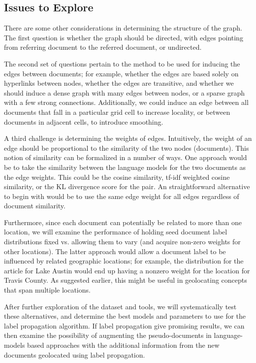 \subsection{Issues to Explore}
There are some other considerations in determining the structure of the graph.
The first question is whether the graph should be directed, with edges pointing from referring document to the referred document, or undirected. 

The second set of questions pertain to the method to be used for inducing the edges between documents;
for example, whether the edges are based solely on hyperlinks between nodes, whether the edges are transitive, and whether we should induce a dense graph with many edges between nodes, or a sparse graph with a few strong connections.
Additionally, we could induce an edge between all documents that fall in a particular grid cell to increase locality, or between documents in adjacent cells, to introduce smoothing.

A third challenge is determining the weights of edges.
Intuitively, the weight of an edge should be proportional to the similarity of the two nodes (documents).
This notion of similarity can be formalized in a number of ways.
One approach would be to take the similarity between the language models for the two documents as the edge weights.
This could be the cosine similarity, tf-idf weighted cosine similarity, or the KL divergence score for the pair.
An straightforward alternative to begin with would be to use the same edge weight for all edges regardless of document similarity.
 
Furthermore, since each document can potentially be related to more than one location, we will examine the performance of holding seed document label distributions fixed vs. allowing them to vary (and acquire non-zero weights for other locations).
The latter approach would allow a document label to be influenced by related geographic locations; 
for example, the distribution for the article for Lake Austin would end up having a nonzero weight for the location for Travis County.
As suggested earlier, this might be useful in geolocating concepts that span multiple locations.

After further exploration of the dataset and tools, we will systematically test these alternatives, and determine the best models and parameters to use for the label propagation algorithm.
If label propagation give promising results, we can then examine the possibility of augmenting the pseudo-documents in language-models based approaches with the additional information from the new documents geolocated using label propagation.

